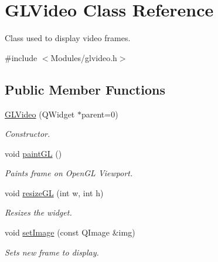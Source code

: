 \hypertarget{class_g_l_video}{
\section{GLVideo Class Reference}
\label{d8/dce/class_g_l_video}
}


Class used to display video frames.  




{\ttfamily \#include $<$Modules/glvideo.h$>$}

\subsection*{Public Member Functions}
\begin{DoxyCompactItemize}
\item 
\hyperlink{class_g_l_video_a97f0409eceae712605b84baa8daedd3d}{GLVideo} (QWidget $\ast$parent=0)
\begin{DoxyCompactList}\small\item\em Constructor. \item\end{DoxyCompactList}\item 
\hypertarget{class_g_l_video_af317ae41881ac10b6874ab4ed3515b51}{
void \hyperlink{class_g_l_video_af317ae41881ac10b6874ab4ed3515b51}{paintGL} ()}
\label{d8/dce/class_g_l_video_af317ae41881ac10b6874ab4ed3515b51}

\begin{DoxyCompactList}\small\item\em Paints frame on OpenGL Viewport. \item\end{DoxyCompactList}\item 
void \hyperlink{class_g_l_video_a060978145c07de786f9aff869869035e}{resizeGL} (int w, int h)
\begin{DoxyCompactList}\small\item\em Resizes the widget. \item\end{DoxyCompactList}\item 
void \hyperlink{class_g_l_video_adcc0ce3b37902336aa3a52ab3ae60eb1}{setImage} (const QImage \&img)
\begin{DoxyCompactList}\small\item\em Sets new frame to display. \item\end{DoxyCompactList}\end{DoxyCompactItemize}


